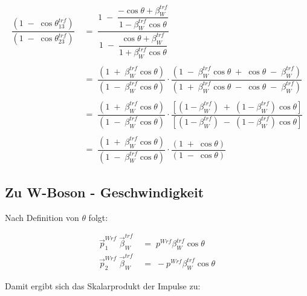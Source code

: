 \documentclass[
a4paper,                                %
twoside,                                %
BCOR1.4cm,                      %
ngerman,                                %
10pt,                           %
headings=normal,                %
headsepline,                    %
clearplainpage, %
final,                                  %
div=14,
parskip=full
]{scrbook}
\begin{document}
\begin{align}
	\dfrac{\left( 1\;-\;\cos \theta_{13}^{trf} \right)}
	{\left( 1\;-\;\cos \theta_{23}^{trf} \right)}
\;&=\;
	\dfrac{ 1\;-\;\dfrac{- \cos \theta + \beta_{W}^{trf}}
	{1 - \beta_{W}^{trf} \cos \theta} }
	{ 1\;-\;\dfrac{\cos \theta + \beta_{W}^{trf}}
	{1 + \beta_{W}^{trf} \cos \theta} }
\nonumber
\\
\nonumber
\\
\;&=\;
	\dfrac{\left( 1\;+\;\beta_{W}^{trf} \cos \theta \right)}
	{\left( 1\;-\;\beta_{W}^{trf} \cos \theta \right)}
	\cdot
	\dfrac{\left( 1\;-\;\beta_{W}^{trf} \cos \theta
	\;+\;\cos \theta\;-\;\beta_{W}^{trf} \right)}
	{\left( 1\;+\;\beta_{W}^{trf} \cos \theta
	\;-\;\cos \theta\;-\;\beta_{W}^{trf} \right)}
\nonumber
\\
\nonumber
\\
\;&=\;
	\dfrac{\left( 1\;+\;\beta_{W}^{trf} \cos \theta \right)}
	{\left( 1\;-\;\beta_{W}^{trf} \cos \theta \right)}
	\cdot
	\dfrac{\left[ \left( 1-\beta_{W}^{trf} \right)
	\;+\;\left( 1-\beta_{W}^{trf} \right) \cos \theta \right]}
	{\left[ \left( 1-\beta_{W}^{trf} \right)
	\;-\;\left( 1-\beta_{W}^{trf} \right) \cos \theta \right]}
\nonumber
\\
\nonumber
\\
\;&=\;
	\dfrac{\left( 1\;+\;\beta_{W}^{trf} \cos \theta \right)}
	{\left( 1\;-\;\beta_{W}^{trf} \cos \theta \right)}
	\cdot
	\dfrac{\left( 1\;+\;\cos \theta \right)}
	{\left( 1\;-\;\cos \theta \right)}
\end{align}

\subsection{Zu W-Boson - Geschwindigkeit}\label{anhangbetaW}

Nach Definition von $ \theta $ folgt:

\begin{align*}
\vec{p}_{1}^{Wrf}\;\vec{\beta}_{W}^{trf}
\;&=\; p^{Wrf} \beta_{W}^{trf} \cos\theta
\\ 
\vec{p}_{2}^{Wrf}\;\vec{\beta}_{W}^{trf}
\;&=\; -p^{Wrf} \beta_{W}^{trf} \cos\theta 
\end{align*}

Damit ergibt sich das Skalarprodukt der Impulse zu:
\end{document}
